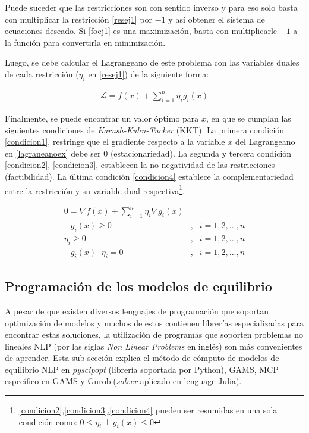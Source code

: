 Puede suceder que las restricciones son con sentido inverso y para eso solo basta con multiplicar la restricción \ref{resej1} por $-1$ y así obtener el sistema de ecuaciones deseado. Si \ref{foej1} es una maximización, basta con multiplicarle $-1$ a la función para convertirla en minimización.
\vspace{2.5mm}

Luego, se debe calcular el Lagrangeano de este problema con las variables duales de cada restricción ($\eta_{i}$ en \ref{resej1}) de la siguiente forma:

\begin{align}
    \mathcal{L}=f(x) +  \sum_{i=1}^{n}\eta_{i}g_{i}(x)\label{lagraneanoex}
\end{align}

Finalmente, se puede encontrar un valor óptimo para $x$, en que se cumplan las siguientes condiciones de \textit{Karush-Kuhn-Tucker} (KKT). La primera condición \ref{condicion1}, restringe que el gradiente respecto a la variable $x$ del Lagrangeano en \ref{lagraneanoex} debe ser 0 (estacionariedad). La segunda y tercera condición \ref{condicion2}, \ref{condicion3}, establecen la no negatividad de las restricciones (factibilidad). La última condición \ref{condicion4} establece la complementariedad entre la restricción y su variable dual respectiva\footnote{\ref{condicion2},\ref{condicion3},\ref{condicion4} pueden ser resumidas en una sola condición como: $0\leq\eta_{i}\perp g_{i}(x)\leq 0$}. 

\begin{align}
    0 = \nabla f(x) + \sum_{i=1}^{n} \eta_{i}\nabla g_{i}(x) \label{condicion1}\\
    -g_{i}(x) \geq 0 &, & i=1,2,...,n  \label{condicion2}\\
    \eta_{i} \geq 0 &, & i=1,2,...,n \label{condicion3}\\
    -g_{i}(x)\cdot \eta_{i} = 0 &, & i=1,2,...,n \label{condicion4}
\end{align}

\subsection{Programación de los modelos de equilibrio}\label{explisolvers}

A pesar de que existen diversos lenguajes de programación que soportan optimización de modelos y muchos de estos contienen librerías especializadas para encontrar estas soluciones, la utilización de programas que soporten problemas no lineales NLP (por las siglas \emph{Non Linear Problems} en inglés) son más convenientes de aprender. Esta sub-sección explica el método de cómputo de modelos de equilibrio NLP en \textit{pyscipopt} (librería soportada por Python), GAMS, MCP específico en GAMS y Gurobi(\textit{solver} aplicado en lenguage Julia).

